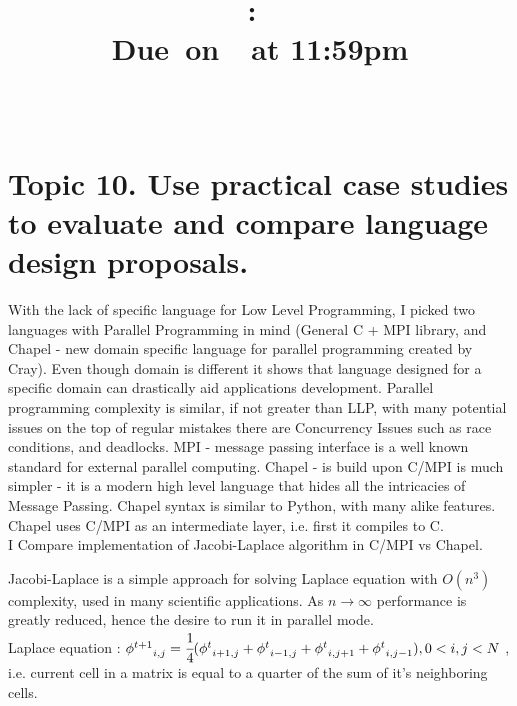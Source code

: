 \documentclass{article}
\title{
    \vspace{2in}
    \textmd{\textbf{\hmwkClass:\ \hmwkTitle}}\\
        \normalsize\vspace{0.1in}\small{Due\ on\ \hmwkDueDate\ at 11:59pm}\\
        \vspace{0.1in}\large{\textit{\hmwkClassInstructor\ \hmwkClassTime}}
    \vspace{3in}
}
\author{\textbf{\hmwkAuthorName}}
\date{}
\begin{document}
\maketitle

\pagebreak

        \section{Topic 10.  Use practical case studies to evaluate and compare language design proposals.}


        With the lack of specific language for Low Level Programming, I picked two languages with
        Parallel Programming in mind (General C + MPI library, and Chapel - new domain specific
        language for parallel programming created by Cray).  Even though domain is different it
        shows that language designed for a specific domain can drastically aid applications
        development.
        Parallel programming complexity is similar, if not greater than
        LLP, with many potential issues on the top of regular mistakes there are Concurrency Issues
        such as race conditions, and deadlocks.
        MPI - message passing interface is a well known standard for external parallel computing.
        Chapel - is build upon C/MPI is much simpler - it is a modern high level language that hides
        all the intricacies of Message Passing. Chapel syntax is similar to Python, with many alike
        features. Chapel uses C/MPI as an intermediate layer, i.e. first it compiles to C.\\
    
        I Compare implementation of Jacobi-Laplace algorithm in C/MPI vs Chapel. 
        
        Jacobi-Laplace is a
        simple approach for solving Laplace equation with $O(n^3)$ complexity, used in many
        scientific applications. As $n\rightarrow \infty$ performance is greatly reduced, hence the
        desire to run it in parallel mode.\\
        Laplace equation : 
        ${\phi^{t+1}}_{i,j} = \cfrac{1}{4} ({\phi^{t}}_{i+1,j} + {\phi^{t}}_{i-1,j} +
        {\phi^{t}}_{i,j+1} + {\phi^{t}}_{i,j-1}), 0 < i, j< N$ , i.e. current cell in a matrix is
        equal to a quarter of the sum of it's neighboring cells.\\
    
\end{document}
